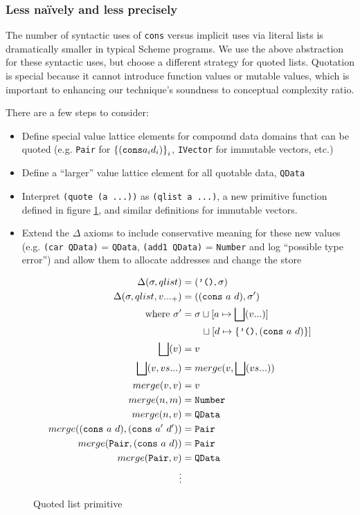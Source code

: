 \documentclass[preprint]{sigplanconf}
\begin{document}
\subsubsection{Less na\"ively and less precisely}

The number of syntactic uses of {\tt cons} versus implicit uses via
literal lists is dramatically smaller in typical Scheme programs. We
use the above abstraction for these syntactic uses, but choose a
different strategy for quoted lists. Quotation is special because it
cannot introduce function values or mutable values, which is important
to enhancing our technique's soundness to conceptual complexity ratio.

There are a few steps to consider:
\begin{itemize}
 \item{Define special value lattice elements for compound data domains that can be quoted
       (e.g. {\tt Pair} for $\left\lbrace ({\tt cons} a_i d_i)\right\rbrace_i$, {\tt IVector} for immutable vectors, etc.)}
 \item{Define a ``larger'' value lattice element for all quotable data, {\tt QData}}
 \item{Interpret {\tt (quote (a ...))} as {\tt (qlist a ...)}, a new primitive function defined in figure \ref{fig:qlist},
       and similar definitions for immutable vectors.}
 \item{Extend the $\Delta$ axioms to include conservative meaning for these new values (e.g. {\tt (car QData)} = {\tt QData}, {\tt (add1 QData)} = {\tt Number} and log ``possible type error'') and allow them to allocate addresses and change the store}
\end{itemize}

\begin{figure}
\begin{align*}
\Delta(\sigma, qlist) &= (\mbox{{\tt '()}}, \sigma) \\
\Delta(\sigma, qlist, v ..._+) &= (({\tt cons}\ a\ d), \sigma') \\
\qquad \mbox{where } \sigma' &= \sigma\sqcup[a \mapsto \bigsqcup(v ...)] \\
                            &\qquad \sqcup[d \mapsto \lbrace \mbox{{\tt '()}}, ({\tt cons}\ a\ d)\rbrace] \\
\bigsqcup(v) &= v \\
\bigsqcup(v, vs ...) &= merge(v, \bigsqcup(vs ...)) \\
merge(v, v) &= v \\
merge(n, m) &= {\tt Number} \\
merge(n, v) &= {\tt QData} \\
merge(({\tt cons}\ a\ d), ({\tt cons}\ a'\ d')) &= {\tt Pair} \\
merge({\tt Pair}, ({\tt cons}\ a\ d)) &= {\tt Pair} \\
merge({\tt Pair}, v) &= {\tt QData} \\
\vdots
\end{align*}
\caption{Quoted list primitive}
\label{fig:qlist}
\end{figure}
\end{document}
